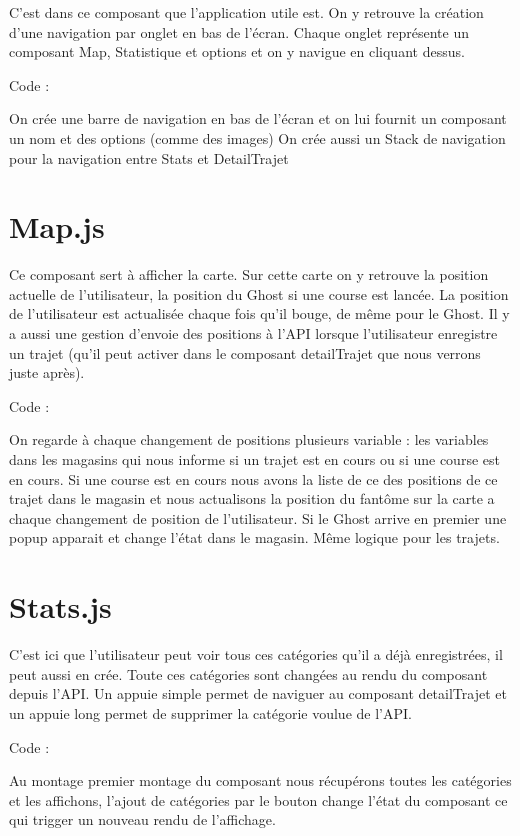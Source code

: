 C’est dans ce composant que l’application utile est. On y retrouve la création d’une navigation par onglet en bas de l’écran. Chaque onglet représente un composant Map, Statistique et options et on y navigue en cliquant dessus.

Code :

On crée une barre de navigation en bas de l’écran et on lui fournit un composant un nom et des options (comme des images)
On crée aussi un Stack de navigation pour la navigation entre Stats et DetailTrajet

\section{Map.js}

Ce composant sert à afficher la carte. Sur cette carte on y retrouve la position actuelle de l’utilisateur, la position du Ghost si une course est lancée.
La position de l’utilisateur est actualisée chaque fois qu’il bouge, de même pour le Ghost.
Il y a aussi une gestion d’envoie des positions à l’API lorsque l’utilisateur enregistre un trajet (qu’il peut activer dans le composant detailTrajet que nous verrons juste après).

Code :

On regarde à chaque changement de positions plusieurs variable : les variables dans les magasins qui nous informe si un trajet est en cours ou si une course est en cours. Si une course est en cours nous avons la liste de ce des positions de ce trajet dans le magasin et nous actualisons la position du fantôme sur la carte a chaque changement de position de l’utilisateur. Si le Ghost arrive en premier une popup apparait et change l’état dans le magasin.
Même logique pour les trajets.

\section{Stats.js}
C’est ici que l’utilisateur peut voir tous ces catégories qu’il a déjà enregistrées, il peut aussi en crée.
Toute ces catégories sont changées au rendu du composant depuis l’API.
Un appuie simple permet de naviguer au composant detailTrajet et un appuie long permet de supprimer la catégorie voulue de l’API.

Code :

Au montage premier montage du composant nous récupérons toutes les catégories et les affichons, l’ajout de catégories par le bouton change l’état du composant ce qui trigger un nouveau rendu de l’affichage.

